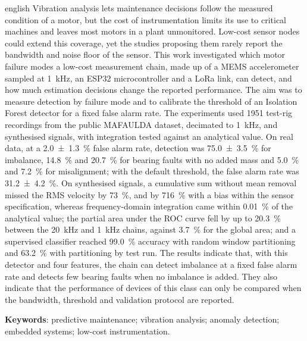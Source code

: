 
\begin{resumo}[Abstract]
\begin{otherlanguage*}{english}
Vibration analysis lets maintenance decisions follow the measured condition of a motor, but the
cost of instrumentation limits its use to critical machines and leaves most motors in a plant
unmonitored. Low-cost sensor nodes could extend this coverage, yet the studies proposing them rarely
report the bandwidth and noise floor of the sensor. This work investigated which motor failure modes
a low-cost measurement chain, made up of a MEMS accelerometer sampled at \SI{1}{\kilo\hertz}, an ESP32
microcontroller and a LoRa link, can detect, and how much estimation decisions change the reported
performance. The aim was to measure detection by failure mode and to calibrate the threshold of an
Isolation Forest detector for a fixed false alarm rate. The experiments used \num{1951} test-rig
recordings from the public MAFAULDA dataset, decimated to \SI{1}{\kilo\hertz}, and synthesised signals,
with integration tested against an analytical value. On real data, at a \SI{2.0 \pm 1.3}{\percent}
false alarm rate, detection was \SI{75.0 \pm 3.5}{\percent} for imbalance, \SI{14.8}{\percent} and
\SI{20.7}{\percent} for bearing faults with no added mass and \SI{5.0}{\percent} and \SI{7.2}{\percent}
for misalignment; with the default threshold, the false alarm rate was \SI{31.2 \pm 4.2}{\percent}. On
synthesised signals, a cumulative sum without mean removal missed the RMS velocity by \SI{73}{\percent},
and by \SI{716}{\percent} with a bias within the sensor specification, whereas frequency-domain
integration came within \SI{0.01}{\percent} of the analytical value; the partial area under the ROC curve
fell by up to \SI{20.3}{\percent} between the \SI{20}{\kilo\hertz} and \SI{1}{\kilo\hertz} chains, against
\SI{3.7}{\percent} for the global area; and a supervised classifier reached \SI{99.0}{\percent} accuracy
with random window partitioning and \SI{63.2}{\percent} with partitioning by test run.  The results indicate that, with this detector and four
features, the chain can detect imbalance at a fixed false alarm rate and detects few bearing faults when no
imbalance is added. They also indicate that the performance of devices of this class can only be compared
when the bandwidth, threshold and validation protocol are reported.

\vspace{\onelineskip}
\noindent
\textbf{Keywords}: predictive maintenance; vibration analysis; anomaly detection;
embedded systems; low-cost instrumentation.
\end{otherlanguage*}
\end{resumo}
